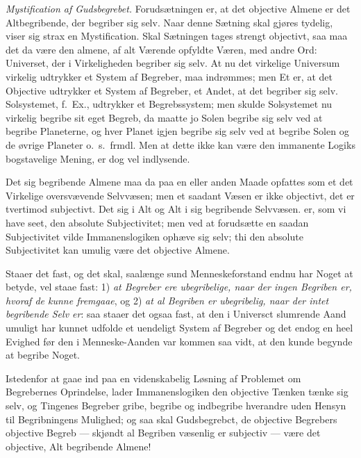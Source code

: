 \documentclass[12pt]{book}
\newcommand{\opage}[1]{\marginnote{\footnotesize\textit{[#1]}}}
\begin{document}
\emph{Mystification af Gudsbegrebet.}
Forudsætningen er, at det objective Almene er det Altbegribende, der
begriber sig selv. Naar denne Sætning skal gjøres tydelig, viser sig
strax en Mystification. Skal Sætningen tages strengt objectivt, saa
maa det da være den almene, af alt Værende opfyldte Væren, med andre
Ord: Universet, der i Virkeligheden begriber sig selv. At nu det
virkelige Universum virkelig udtrykker et System af Begreber, maa
indrømmes; men Et er, at det Objective udtrykker et System af
Begreber, et Andet, at det begriber sig selv. Solsystemet, f.~Ex.,
udtrykker et Begrebssystem; men skulde Solsystemet nu virkelig
begribe sit eget Begreb, da maatte jo Solen begribe sig selv ved at
begribe Planeterne, og hver Planet igjen begribe sig selv ved at
begribe Solen og de øvrige Planeter o.~s.~frmdl. Men at dette ikke
kan være den immanente Logiks bogstavelige Mening, er dog vel
indlysende.

Det sig begribende Almene maa da paa en eller anden Maade opfattes
som et det Virkelige oversvævende Selvvæsen; men et saadant Væsen er
ikke objectivt, det er tvertimod subjectivt. Det sig i Alt og Alt i
sig begribende Selvvæsen. er, som vi have seet, den absolute
Subjectivitet; men ved at forudsætte en saadan Subjectivitet vilde
Immanenslogiken ophæve sig selv; thi den absolute Subjectivitet kan
umulig være det objective Almene.

\opage{88} Staaer det fast, og det skal, saalænge sund Menneskeforstand endnu
har Noget at betyde, vel staae fast: 1) \emph{at Begreber ere
ubegribelige, naar der ingen Begriben er, hvoraf de kunne fremgaae},
og 2) \emph{at al Begriben er ubegribelig, naar der intet begribende
Selv er}: saa staaer det ogsaa fast, at den i Universct slumrende
Aand umuligt har kunnet udfolde et uendeligt System af Begreber og
det endog en heel Evighed før den i Menneske-Aanden var kommen saa
vidt, at den kunde begynde at begribe Noget.

Istedenfor at gaae ind paa en videnskabelig Løsning af Problemet om
Begrebernes Oprindelse, lader Immanenslogiken den objective Tænken
tænke sig selv, og Tingenes Begreber gribe, begribe og indbegribe
hverandre uden Hensyn til Begribningens Mulighed; og saa skal
Gudsbegrebct, de objective Begrebers objective Begreb --- skjøndt al
Begriben væsenlig er subjectiv --- være det objective, Alt
begribende Almene!
\end{document}
